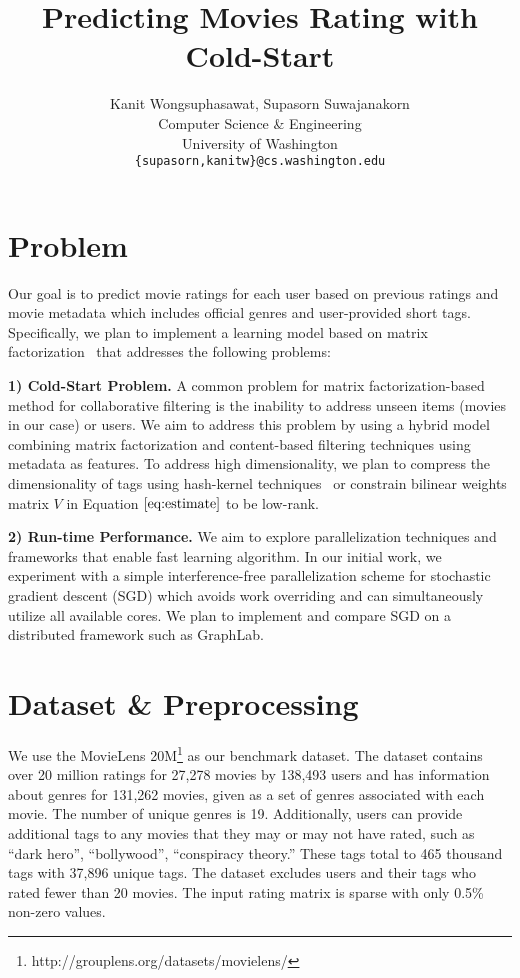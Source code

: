\documentclass{article} %
\title{Predicting Movies Rating with Cold-Start}
\author{
	Kanit Wongsuphasawat, Supasorn Suwajanakorn \\
	Computer Science \& Engineering\\
	University of Washington\\
	\texttt{\{supasorn,kanitw\}@cs.washington.edu} \\
}
\begin{document}
	\maketitle

\section{Problem}
Our goal is to predict movie ratings for each user based on previous ratings and movie metadata which includes official genres and user-provided short tags.  Specifically, we plan to implement a learning model based on matrix factorization~\cite{koren:matrix} that addresses the following problems:

\textbf{1) Cold-Start Problem.} A common problem for matrix factorization-based method for collaborative filtering is the inability to address unseen items (movies in our case) or users.  We aim to address this problem by using a hybrid model combining matrix factorization and content-based filtering techniques using metadata as features. To address high dimensionality, we plan to compress the dimensionality of tags using hash-kernel techniques~\cite{shi:hashkernels} or constrain bilinear weights matrix $V$ in Equation $\ref{eq:estimate}$ to be low-rank.

\textbf{2) Run-time Performance.} We aim to explore parallelization techniques and frameworks that enable fast learning algorithm.  In our initial work, we experiment with a simple interference-free parallelization scheme for stochastic gradient descent (SGD) which avoids work overriding and can simultaneously utilize all available cores. We plan to implement and compare SGD on a distributed framework such as GraphLab.


\section{Dataset \& Preprocessing}
We use the MovieLens 20M\footnote{http://grouplens.org/datasets/movielens/}
as our benchmark dataset.  The dataset contains over 20 million ratings for 27,278 movies by 138,493 users and has information about genres for 131,262 movies, given as a set of genres associated with each movie. The number of unique genres is 19. Additionally, users can provide additional tags to any movies that they may or may not have rated, such as ``dark hero'', ``bollywood'', ``conspiracy theory.''  These tags total to 465 thousand tags with 37,896 unique tags. The dataset excludes users  and their tags who rated fewer than 20 movies. The input rating matrix is sparse with only 0.5\% non-zero values.
\end{document}

